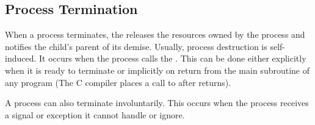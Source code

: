 \subsection{Process Termination}\label{subsec:Process_Termination}
When a process terminates, the  releases the resources owned by the process and notifies the child’s parent of its demise.
Usually, process destruction is self-induced.
It occurs when the process calls the  .
This can be done either explicitly when it is ready to terminate or implicitly on return from the main subroutine of any program (The C compiler places a call to  after  returns).

A process can also terminate involuntarily.
This occurs when the process receives a signal or exception it cannot handle or ignore.

